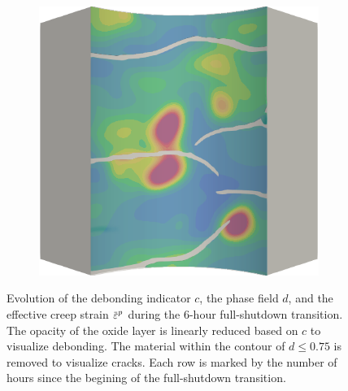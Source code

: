 \begin{figure}[!htbp]
\begin{subfigure}{0.19\textwidth}
  \end{subfigure}
  \hspace{0.06\textwidth}
  \begin{subfigure}{0.19\textwidth}
    \centering
    \includegraphics[width=\textwidth]{Chapter5/figures/spallation/ep.0036}
  \end{subfigure}
  \caption[Animations of variables during the full-shutdown transition.]{Evolution of the debonding indicator $c$, the phase field $d$, and the effective creep strain $\ep$ during the 6-hour full-shutdown transition. The opacity of the oxide layer is linearly reduced based on $c$ to visualize debonding. The material within the contour of $d \leqslant 0.75$ is removed to visualize cracks. Each row is marked by the number of hours since the begining of the full-shutdown transition.}
  \label{fig: Chapter5/spallation/animation_shutdown}
\end{figure}
